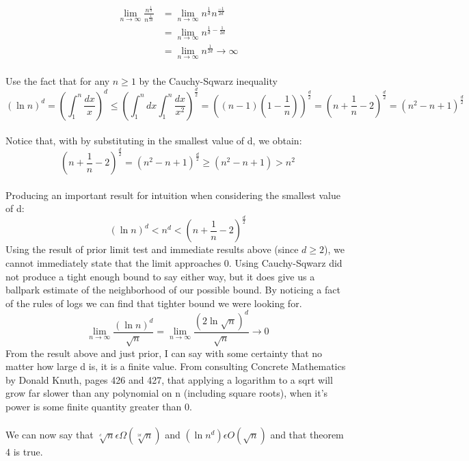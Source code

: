 \documentclass[12pt]{article}
\begin{document}
\begin{align}
\lim_{n\to\infty} \frac{n^{\frac{1}{d}}}{n^{\frac{1}{2d}}} &= \lim_{n\to\infty} n^{\frac{1}{d}} n^{\frac{-1}{2d}}\\
&= \lim_{n\to\infty} n^{\frac{1}{d}-\frac{1}{2d}}\\
&= \lim_{n\to\infty} n^{\frac{1}{2d}} \rightarrow \infty
\end{align}\\
Use the fact that for any \begin{math} n  \geq 1\end{math} by the Cauchy-Sqwarz inequality\
\[(\ln{n})^d = (\int_{1}^{n} \frac{dx}{x})^d \leq (\int_{1}^{n} dx \int_{1}^{n} \frac{dx}{x^2})^{\frac{d}{2}} = ((n-1)(1-\frac{1}{n}))^{\frac{d}{2}} = (n + \frac{1}{n} - 2)^{\frac{d}{2}} = (n^2-n+1)^{\frac{d}{2}}\]\\
Notice that, with by substituting in the smallest value of d, we obtain:
\[(n + \frac{1}{n} - 2)^{\frac{d}{2}} = (n^2-n+1)^{\frac{d}{2}} \geq (n^2-n+1) > n^2\]\\
Producing an important result for intuition when considering the smallest value of d:
\[(\ln{n})^d < n^d < (n + \frac{1}{n} - 2)^{\frac{d}{2}}\]
Using the result of prior limit test and immediate results above (since \begin{math}d \geq 2\end{math}), we cannot immediately state that the limit approaches 0. Using Cauchy-Sqwarz did not produce a tight enough bound to say either way, but it does give us a ballpark estimate of the neighborhood of our possible bound. By noticing a fact of the rules of logs we can find that tighter bound we were looking for.
\[\lim_{n\to\infty} \frac{(\ln{n})^d}{\sqrt{n}} =\lim_{n\to\infty} \frac{(2\ln{\sqrt{n}})^d}{\sqrt{n}} \rightarrow 0\]
From the result above and just prior, I can say with some certainty that no matter how large d is, it is a finite value. From consulting Concrete Mathematics by Donald Knuth, pages 426 and 427, that applying a logarithm to a sqrt will grow far slower than any polynomial on n (including square roots), when it's power is some finite quantity greater than 0.\\\\
We can now say that \begin{math}\sqrt[^d]{n} \epsilon \Omega (\sqrt[^{2d}]{n})\end{math} and \begin{math}(\ln {n}^d) \epsilon O(\sqrt{n})\end{math} and that theorem 4 is true.
\end{document}

